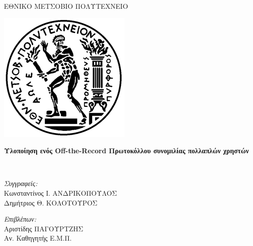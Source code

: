 \documentclass[
11pt, %
english, %
singlespacing, %
parskip, %
headsepline, %
]{MastersDoctoralThesis} %
\author{\mbox{Konsantinos \textsc{Andrikopoulos}}, Dimitrios \textsc{Kolotouros}} %
\begin{document}
\frontmatter %

\pagestyle{plain} %

\begin{titlepage}
\begin{center}

{\scshape\LARGE ΕΘΝΙΚΟ ΜΕΤΣΟΒΙΟ ΠΟΛΥΤΕΧΝΕΙΟ\par} %
{\centering \includegraphics[scale=0.6]{Pyrforos.png}}
\vspace{1.5cm}
\HRule \\[0.4cm] %
{\huge \bfseries Υλοποίηση ενός Off-the-Record Πρωτοκόλλου συνομιλίας πολλαπλών χρηστών\par}\vspace{0.4cm} %
\HRule \\[1.5cm] %

\begin{minipage}[t]{0.49\textwidth}
\begin{flushleft} \large
\emph{Συγγραφείς:}\\
\small
Κωνσταντίνος Ι. ΑΝΔΡΙΚΟΠΟΥΛΟΣ \\
Δημήτριος Θ. ΚΟΛΟΤΟΥΡΟΣ\\%
\end{flushleft}
\end{minipage}
\begin{minipage}[t]{0.49\textwidth}
\begin{flushright} \large
\emph{Επιβλέπων:} \\
Αριστίδης ΠΑΓΟΥΡΤΖΗΣ\\
Αν. Καθηγητής Ε.Μ.Π.%
\end{flushright}
\end{minipage}\\[3cm]


\end{center}
\end{titlepage}
\end{document}
